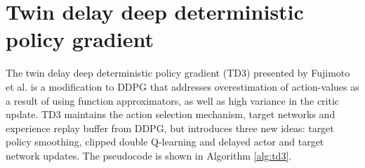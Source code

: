 \section{Twin delay deep deterministic policy gradient}\label{sec:td3}

The twin delay deep deterministic policy gradient (TD3) presented by Fujimoto et al. \cite{Fujimoto2018} is a modification to DDPG that addresses overestimation of action-values as a result of using function approximators, as well as high variance in the critic update.
TD3 maintains the action selection mechanism, target networks and experience replay buffer from DDPG, but introduces three new ideas: target policy smoothing, clipped double Q-learning and delayed actor and target network updates.
The pseudocode is shown in Algorithm \ref{alg:td3}.




